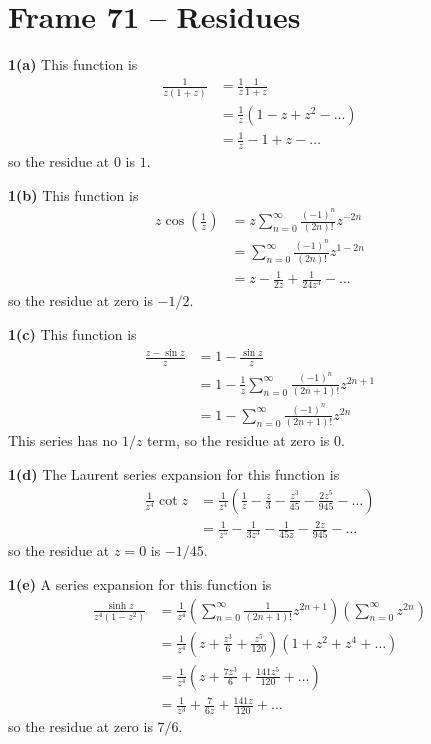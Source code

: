 \documentclass{article}
\begin{document}
\section{Frame 71 -- Residues}
\textbf{1(a)}
This function is
\begin{align*}
	\frac{1}{z(1 + z)}
	&= \frac{1}{z} \frac{1}{1 + z} \\
	&= \frac{1}{z} (1 - z + z^2 - \dots) \\
	&= \frac{1}{z} - 1 + z - \dots
\end{align*}
so the residue at $0$ is $1$.

\textbf{1(b)}
This function is
\begin{align*}
	z\cos \left(\frac{1}{z} \right)
	&= z \sum_{n=0}^\infty \frac{(-1)^n}{(2n)!} z^{-2n} \\
	&= \sum_{n=0}^\infty \frac{(-1)^n}{(2n)!} z^{1 - 2n} \\
	&= z - \frac{1}{2z} + \frac{1}{24 z^3} - \dots
\end{align*}
so the residue at zero is $-1/2$.

\textbf{1(c)}
This function is
\begin{align*}
	\frac{z - \sin z}{z}
	&= 1 - \frac{\sin z}{z} \\
	&= 1 - \frac{1}{z} \sum_{n=0}^\infty \frac{(-1)^n}{(2n+1)!} z^{2n + 1} \\
	&= 1 - \sum_{n=0}^\infty \frac{(-1)^n}{(2n+1)!} z^{2n} 
\end{align*}
This series has no $1/z$ term, so the residue at zero is $0$.

\textbf{1(d)}
The Laurent series expansion for this function is
\begin{align*}
	\frac{1}{z^4} \cot z
	&= \frac{1}{z^4} \left( \frac{1}{z} - \frac{z}{3} - \frac{z^3}{45} - \frac{2z^5}{945} - \dots \right) \\
	&= \frac{1}{z^5} - \frac{1}{3z^3} - \frac{1}{45z} - \frac{2z}{945} - \dots
\end{align*}
so the residue at $z = 0$ is $-1/45$.

\textbf{1(e)}
A series expansion for this function is
\begin{align*}
	\frac{\sinh z}{z^4 (1 - z^2)}
	&= \frac{1}{z^4} \left( \sum_{n=0}^\infty \frac{1}{(2n+1)!} z^{2n+1} \right) \left(\sum_{n=0}^\infty z^{2n} \right) \\
	&= \frac{1}{z^4} \left( z + \frac{z^3}{6} + \frac{z^5}{120} \right) \left( 1 + z^2 + z^4 + \dots \right) \\
	&= \frac{1}{z^4} \left( z + \frac{7z^3}{6} + \frac{141 z^5}{120} + \dots \right) \\
	&= \frac{1}{z^3} + \frac{7}{6z} + \frac{141z}{120} + \dots
\end{align*}
so the residue at zero is $7/6$.
\end{document}
